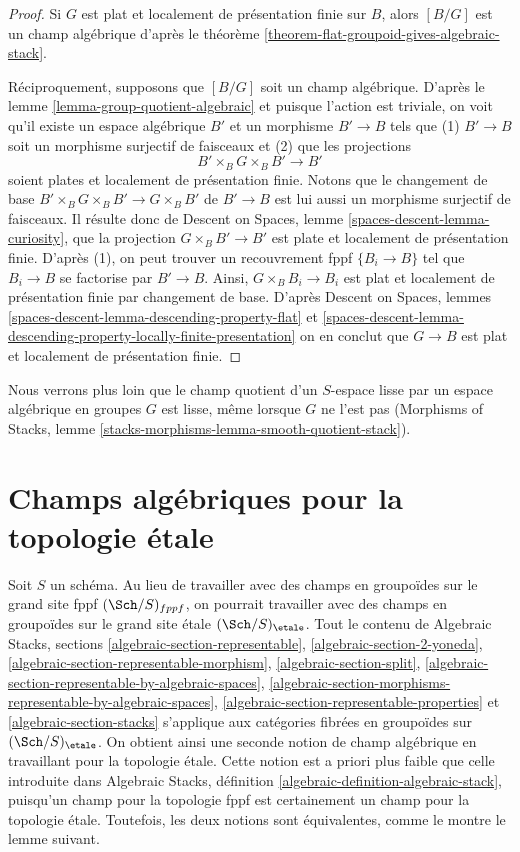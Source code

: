\begin{proof}
Si $G$ est plat et localement de présentation finie sur $B$, alors
$[B/G]$ est un champ algébrique d'après le
théorème \ref{theorem-flat-groupoid-gives-algebraic-stack}.

\medskip\noindent
Réciproquement, supposons que $[B/G]$ soit un champ algébrique. D'après le
lemme \ref{lemma-group-quotient-algebraic}
et puisque l'action est triviale, on voit
qu'il existe un espace algébrique $B'$ et un morphisme
$B' \to B$ tels que (1) $B' \to B$ soit un morphisme surjectif
de faisceaux et (2) que les projections
$$
B' \times_B G \times_B B' \to B'
$$
soient plates et localement de présentation finie. Notons que le changement de base
$B' \times_B G \times_B B' \to G \times_B B'$ de $B' \to B$
est lui aussi un morphisme surjectif de faisceaux. Il résulte donc de
Descent on Spaces, lemme \ref{spaces-descent-lemma-curiosity},
que la projection $G \times_B B' \to B'$ est plate et localement
de présentation finie. D'après (1), on peut trouver un recouvrement fppf
$\{B_i \to B\}$ tel que $B_i \to B$ se factorise par $B' \to B$.
Ainsi, $G \times_B B_i \to B_i$ est plat et localement de présentation finie
par changement de base. D'après
Descent on Spaces, lemmes
\ref{spaces-descent-lemma-descending-property-flat} et
\ref{spaces-descent-lemma-descending-property-locally-finite-presentation}
on en conclut que $G \to B$ est plat et localement de présentation finie.
\end{proof}

\noindent
Nous verrons plus loin que le champ quotient d'un $S$-espace lisse
par un espace algébrique en groupes $G$ est lisse, même lorsque $G$ ne l'est pas
(Morphisms of Stacks, lemme
\ref{stacks-morphisms-lemma-smooth-quotient-stack}).




\section{Champs algébriques pour la topologie étale}
\label{section-stacks-etale}

\noindent
Soit $S$ un schéma. Au lieu de travailler avec des champs en groupoïdes sur
le grand site fppf $(\Sch/S)_{fppf}$, on pourrait travailler avec des champs en groupoïdes
sur le grand site étale $(\Sch/S)_\etale$. Tout le contenu de
Algebraic Stacks, sections
\ref{algebraic-section-representable},
\ref{algebraic-section-2-yoneda},
\ref{algebraic-section-representable-morphism},
\ref{algebraic-section-split},
\ref{algebraic-section-representable-by-algebraic-spaces},
\ref{algebraic-section-morphisms-representable-by-algebraic-spaces},
\ref{algebraic-section-representable-properties} et
\ref{algebraic-section-stacks}
s'applique aux catégories fibrées en groupoïdes sur $(\Sch/S)_\etale$.
On obtient ainsi une seconde notion de champ algébrique en travaillant pour la
topologie étale. Cette notion est a priori plus faible que celle introduite
dans Algebraic Stacks, définition \ref{algebraic-definition-algebraic-stack},
puisqu'un champ pour la topologie fppf est certainement un champ pour la topologie
étale. Toutefois, les deux notions sont équivalentes, comme le montre le
lemme suivant.

